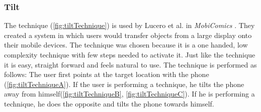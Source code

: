 \subsubsection{Tilt} \label{sec:tiltTechnique}
The \tilt technique (\cref{fig:tiltTechnique}) is used by Lucero et al. in \emph{MobiComics} \cite{Lucero:2012}.
They created a system in which users would transfer objects from a large display onto their mobile devices.
The \tilt technique was chosen because it is a one handed, low complexity technique with few steps needed to activate it. 
Just like the \swipe technique it is easy, straight forward and feels natural to use. 
The \tilt technique is performed as follows:
The user first points at the target location with the phone (\cref{fig:tiltTechniqueA}).
If the user is performing a \push technique, he tilts the phone away from himself(\cref{fig:tiltTechniqueB}, \cref{fig:tiltTechniqueC}).
If he is performing a \pull technique, he does the opposite and tilts the phone towards himself. 

